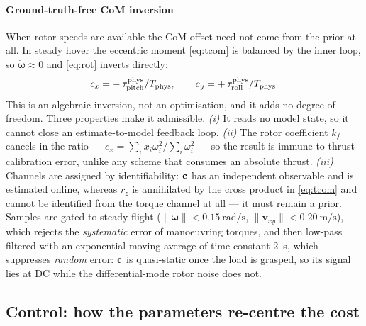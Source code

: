 \paragraph{Ground-truth-free CoM inversion} When rotor speeds are
available the CoM offset need not come from the prior at all. In steady
hover the eccentric moment \eqref{eq:tcom} is balanced by the inner loop,
so $\dot{\boldsymbol{\omega}} \approx 0$ and \eqref{eq:rot} inverts
directly:
\begin{equation}
c_x = -\,\tau_{\mathrm{pitch}}^{\mathrm{phys}} / T_{\mathrm{phys}}, \qquad
c_y = +\,\tau_{\mathrm{roll}}^{\mathrm{phys}} / T_{\mathrm{phys}} .
\label{eq:conline}
\end{equation}
This is an algebraic inversion, not an optimisation, and it adds no degree
of freedom. Three properties make it admissible. \emph{(i)} It reads no
model state, so it cannot close an estimate-to-model feedback loop.
\emph{(ii)} The rotor coefficient $k_f$ cancels in the ratio ---
$c_x = \sum_i x_i \omega_i^2 / \sum_i \omega_i^2$ --- so the result is
immune to thrust-calibration error, unlike any scheme that consumes an
absolute thrust. \emph{(iii)} Channels are assigned by identifiability:
$\mathbf{c}$ has an independent observable and is estimated online, whereas
$r_z$ is annihilated by the cross product in \eqref{eq:tcom} and cannot be
identified from the torque channel at all --- it must remain a prior.
Samples are gated to steady flight
($\|\boldsymbol{\omega}\| < \SI{0.15}{\radian\per\second}$,
$\|\mathbf{v}_{xy}\| < \SI{0.20}{\meter\per\second}$), which rejects the
\emph{systematic} error of manoeuvring torques, and then low-pass filtered
with an exponential moving average of time constant \SI{2}{\second}, which
suppresses \emph{random} error: $\mathbf{c}$ is quasi-static once the load is
grasped, so its signal lies at DC while the differential-mode rotor noise
does not.

\subsection{Control: how the parameters re-centre the cost}\label{sec:model:ctrl}

